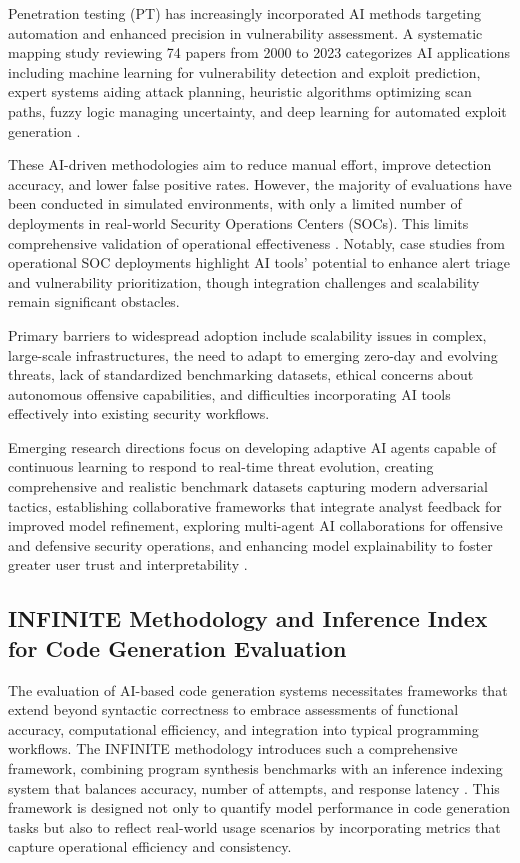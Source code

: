 \documentclass[sigconf]{acmart}
\begin{document}
Penetration testing (PT) has increasingly incorporated AI methods targeting automation and enhanced precision in vulnerability assessment. A systematic mapping study reviewing 74 papers from 2000 to 2023 categorizes AI applications including machine learning for vulnerability detection and exploit prediction, expert systems aiding attack planning, heuristic algorithms optimizing scan paths, fuzzy logic managing uncertainty, and deep learning for automated exploit generation \cite{ref31}.

These AI-driven methodologies aim to reduce manual effort, improve detection accuracy, and lower false positive rates. However, the majority of evaluations have been conducted in simulated environments, with only a limited number of deployments in real-world Security Operations Centers (SOCs). This limits comprehensive validation of operational effectiveness \cite{ref31}. Notably, case studies from operational SOC deployments highlight AI tools' potential to enhance alert triage and vulnerability prioritization, though integration challenges and scalability remain significant obstacles.

Primary barriers to widespread adoption include scalability issues in complex, large-scale infrastructures, the need to adapt to emerging zero-day and evolving threats, lack of standardized benchmarking datasets, ethical concerns about autonomous offensive capabilities, and difficulties incorporating AI tools effectively into existing security workflows.

Emerging research directions focus on developing adaptive AI agents capable of continuous learning to respond to real-time threat evolution, creating comprehensive and realistic benchmark datasets capturing modern adversarial tactics, establishing collaborative frameworks that integrate analyst feedback for improved model refinement, exploring multi-agent AI collaborations for offensive and defensive security operations, and enhancing model explainability to foster greater user trust and interpretability \cite{ref31}.

\subsection{INFINITE Methodology and Inference Index for Code Generation Evaluation}

The evaluation of AI-based code generation systems necessitates frameworks that extend beyond syntactic correctness to embrace assessments of functional accuracy, computational efficiency, and integration into typical programming workflows. The INFINITE methodology introduces such a comprehensive framework, combining program synthesis benchmarks with an inference indexing system that balances accuracy, number of attempts, and response latency \cite{ref9}. This framework is designed not only to quantify model performance in code generation tasks but also to reflect real-world usage scenarios by incorporating metrics that capture operational efficiency and consistency.
\end{document}
